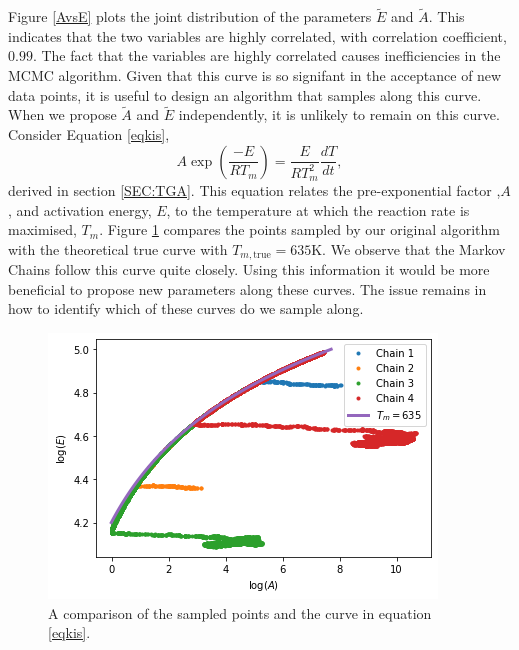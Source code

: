Figure \ref{AvsE} plots the joint distribution of the parameters $\tilde{E}$ and $\tilde{A}$. This indicates that the two variables are highly correlated, with correlation coefficient, $0.99$. The fact that the variables are highly correlated causes inefficiencies in the MCMC algorithm.
Given that this curve is so signifant in the acceptance of new data points, it is useful to design an algorithm that samples along this curve. When we propose $\tilde{A}$ and $\tilde{E}$ independently, it is unlikely to remain on this curve.\\
Consider Equation \ref{eqkis},
\begin{equation}
A\exp\left(\frac{-E}{RT_m}\right)=\frac{E}{RT_m^2}\frac{dT}{dt}, \label{eqkis}
\end{equation}
derived in section \ref{SEC:TGA}.
This equation relates the pre-exponential factor ,$A$, and activation energy, $E$, to the temperature at which the reaction rate is maximised, $T_m$. Figure \ref{fig:eqkis_comp} compares the points sampled by our original algorithm with the theoretical true curve with $T_{m,\text{true}}=635$K. We observe that the Markov Chains follow this curve quite closely. Using this information it would be more beneficial to propose new parameters along these curves. The issue remains in how to identify which of these curves do we sample along.\\
\begin{figure}[h!]
\centering
\includegraphics[width=\linewidth]{figures/bayesian/Theoritcal_Tm.png}
\caption{A comparison of the sampled points and the curve in equation \ref{eqkis}.}
\label{fig:eqkis_comp}
\end{figure}

